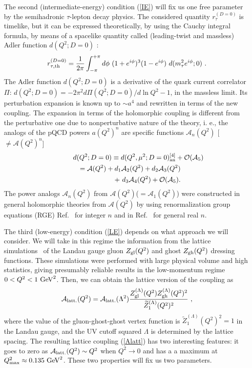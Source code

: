 \documentclass[3p,times,twocolumn]{elsarticle}
\def\be{\begin{equation}}
\def\ee{\end{equation}}
\def\bea{\begin{eqnarray}}
\def\eea{\end{eqnarray}}
\newcommand{\A}{{\mathcal{A}}}
\begin{document}
The second (intermediate-energy) condition (\ref{IE}) will fix us one free parameter by the  semihadronic $\tau$-lepton decay physics.
The considered quantity $r^{(D=0)}_{\tau}$ is timelike, but it can be expressed theoretically, 
by using the Cauchy integral formula, by means of a spacelike quantity called (leading-twist and massless) Adler function $d(Q^2;D=0)$ \cite{Braaten,PichPra}:
\be
r^{(D=0)}_{\tau, {\rm th}} = \frac{1}{2 \pi} \int_{-\pi}^{+ \pi}
d \phi \ (1 + e^{i \phi})^3 (1 - e^{i \phi}) \
d(m_{\tau}^2 e^{i \phi};0) \ .
\label{rtaucont}
\ee
The Adler function $d(Q^2;D=0)$ is a derivative of the quark current correlator $\Pi$: $d(Q^2;D=0) = - 2 \pi^2 d \Pi(Q^2; D=0)/d \ln Q^2 - 1$, in the massless limit. Its perturbation expansion is known up to $\sim a^4$ \cite{d3} and rewritten in terms of the new coupling. The expansion in terms of the holomorphic coupling is different from the perturbative one due to nonperturbative nature of the theory, i. e., the analogs of the pQCD powers $a(Q^2)^n$ are specific functions $\A_n(Q^2)$ [$\not= \A(Q^2)^n$]
\bea
\lefteqn{d(Q^2;D=0)\equiv d(Q^2,\mu^2;D=0)_{\rm an}^{[4]} + {\cal O}(\A_5)}
\nonumber\\
& & = \A(Q^2)+d_1 \A_{2}(Q^2)+d_2 \A_{3}(Q^2)
\nonumber\\
&& + \ d_3 \A_{4}(Q^2) + {\cal O}(\A_5).
\label{dan}
\eea
The power analogs $\A_n(Q^2)$ from $\A(Q^2)$($=\A_1(Q^2)$) were constructed in general holomorphic theories from $\A(Q^2)$ by using renormalization group equations (RGE) Ref.~\cite{CV12} for integer $n$ and in Ref.~\cite{GCAK} for general real $n$.

The third (low-energy) condition (\ref{LE}) depends on what approach we will consider. We will take in this regime the information from the lattice simulations~\cite{LattcoupNf0} of the Landau gauge gluon $Z_{\rm gl}(Q^2)$ and ghost $Z_{\rm gh}(Q^2)$ dressing functions. These simulations were performed with large physical volume and high statistics, giving presumably reliable results in the low-momentum regime $0<Q^2 < 1 \ {\rm GeV}^2$. Then, we can obtain the lattice version of the coupling as 
\be
\A_{\rm latt.}(Q^2)  =  \A_{\rm latt.}(\Lambda^2)  \frac{Z_{\rm gl}^{(\Lambda)}(Q^2) Z_{\rm gh}^{(\Lambda)}(Q^2)^2}{{\widetilde Z}_1 ^{(\Lambda)}(Q^2)^2} \ ,
\label{Alatt}
\ee
where the value of the gluon-ghost-ghost vertex function is ${\widetilde Z}_1 ^{(\Lambda)}(Q^2)^2=1$ in the Landau gauge, and the UV cutoff squared $\Lambda$ is determined by the lattice spacing. The resulting lattice coupling (\ref{Alatt}) has two interesting features: it goes to zero as $\A_{\rm latt.}(Q^2) \sim Q^2$ when $Q^2 \to 0$ and has a a maximum at $Q_{\rm max}^2 \approx 0.135 \ {\rm GeV}^2$. These two properties will fix us two parameters.
\end{document}
